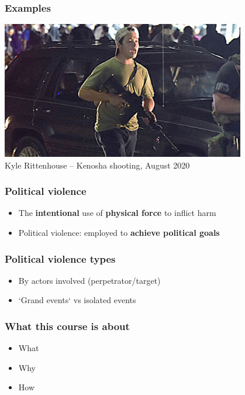 \documentclass[aspectratio=43]{beamer}
\begin{document}
\begin{frame}
\frametitle{Examples}
\centering

\includegraphics[width = 0.8\textwidth]{img/kyle-rittenhouse}\\
Kyle Rittenhouse -- Kenosha shooting, August 2020

\end{frame}

\begin{frame}
\frametitle{Political violence}
\centering

\begin{itemize}
\item The \textbf{intentional} use of \textbf{physical force} to inflict harm
\item Political violence: employed to \textbf{achieve political goals}
\end{itemize}

\end{frame}

\begin{frame}
\frametitle{Political violence types}
\centering

\begin{itemize}
  \item By actors involved (perpetrator/target)
  \item `Grand events` vs isolated events
\end{itemize}

\end{frame}

\begin{frame}
\frametitle{What this course is about}
\centering

\begin{itemize}
\item What
\item Why
\item How
\end{itemize}

\end{frame}
\end{document}

